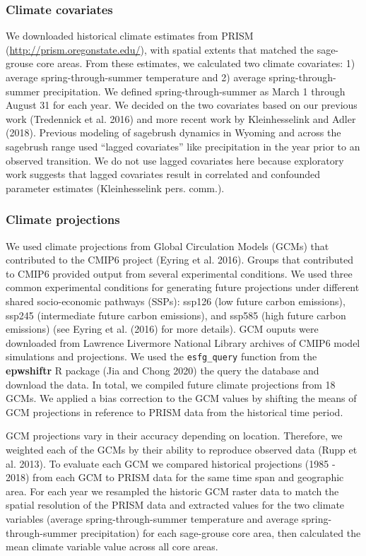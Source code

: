 \documentclass[
  12pt,
]{article}
\begin{document}
\hypertarget{climate-covariates}{%
\subsubsection{Climate covariates}\label{climate-covariates}}

We downloaded historical climate estimates from PRISM (\url{http://prism.oregonstate.edu/}), with spatial extents that matched the sage-grouse core areas.
From these estimates, we calculated two climate covariates: 1) average spring-through-summer temperature and 2) average spring-through-summer precipitation.
We defined spring-through-summer as March 1 through August 31 for each year.
We decided on the two covariates based on our previous work (Tredennick et al. 2016) and more recent work by Kleinhesselink and Adler (2018).
Previous modeling of sagebrush dynamics in Wyoming and across the sagebrush range used ``lagged covariates'' like precipitation in the year prior to an observed transition.
We do not use lagged covariates here because exploratory work suggests that lagged covariates result in correlated and confounded parameter estimates (Kleinhesselink pers. comm.).

\hypertarget{climate-projections}{%
\subsubsection{Climate projections}\label{climate-projections}}

We used climate projections from Global Circulation Models (GCMs) that contributed to the CMIP6 project (Eyring et al. 2016).
Groups that contributed to CMIP6 provided output from several experimental conditions.
We used three common experimental conditions for generating future projections under different shared socio-economic pathways (SSPs): ssp126 (low future carbon emissions), ssp245 (intermediate future carbon emissions), and ssp585 (high future carbon emissions) (see Eyring et al. (2016) for more details).
GCM ouputs were downloaded from Lawrence Livermore National Library archives of CMIP6 model simulations and projections.
We used the \texttt{esfg\_query} function from the \textbf{epwshiftr} R package (Jia and Chong 2020) the query the database and download the data.
In total, we compiled future climate projections from 18 GCMs.
We applied a bias correction to the GCM values by shifting the means of GCM projections in reference to PRISM data from the historical time period.

GCM projections vary in their accuracy depending on location.
Therefore, we weighted each of the GCMs by their ability to reproduce observed data (Rupp et al. 2013).
To evaluate each GCM we compared historical projections (1985 - 2018) from each GCM to PRISM data for the same time span and geographic area.
For each year we resampled the historic GCM raster data to match the spatial resolution of the PRISM data and extracted values for the two climate variables (average spring-through-summer temperature and average spring-through-summer precipitation) for each sage-grouse core area, then calculated the mean climate variable value across all core areas.
\end{document}
